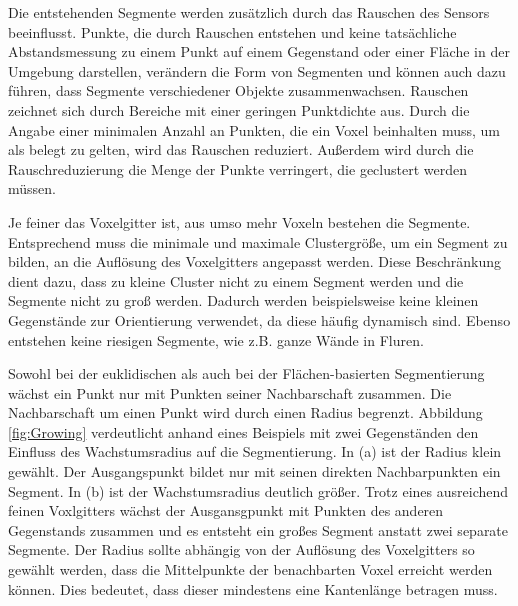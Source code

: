 
Die entstehenden Segmente werden zusätzlich durch das Rauschen des Sensors beeinflusst. Punkte, die durch Rauschen entstehen und keine tatsächliche Abstandsmessung zu einem Punkt auf einem Gegenstand oder einer Fläche in der Umgebung darstellen, verändern die Form von Segmenten und können auch dazu führen, dass Segmente verschiedener Objekte zusammenwachsen. Rauschen zeichnet sich durch Bereiche mit einer geringen Punktdichte aus. Durch die Angabe einer minimalen Anzahl an Punkten, die ein Voxel beinhalten muss, um als belegt zu gelten, wird das Rauschen reduziert. Außerdem wird durch die Rauschreduzierung die Menge der Punkte verringert, die geclustert werden müssen.  

Je feiner das Voxelgitter ist, aus umso mehr Voxeln bestehen die Segmente. Ent\-spre\-chend muss die minimale und maximale Clustergröße, um ein Segment zu bilden, an die Auflösung des Voxelgitters angepasst werden. Diese Beschränkung dient dazu, dass zu kleine Cluster nicht zu einem Segment werden und die Segmente nicht zu groß werden. Dadurch werden beispielsweise keine kleinen Gegenstände zur Orientierung verwendet, da diese häufig dynamisch sind. Ebenso entstehen keine riesigen Segmente, wie z.B. ganze Wände in Fluren. 

Sowohl bei der euklidischen als auch bei der Flächen-basierten Segmentierung wächst ein Punkt nur mit Punkten seiner Nachbarschaft zusammen. Die Nachbarschaft um einen Punkt wird durch einen Radius begrenzt. Abbildung \ref{fig:Growing} verdeutlicht anhand eines Beispiels mit zwei Gegenständen den Einfluss des Wachstumsradius auf die Segmentierung. In (a) ist der Radius klein gewählt. Der Ausgangspunkt bildet nur mit seinen direkten Nachbarpunkten ein Segment. In (b) ist der Wachstumsradius deutlich größer. Trotz eines ausreichend feinen Voxlgitters wächst der Ausgansgpunkt mit Punkten des anderen Gegenstands zusammen und es entsteht ein großes Segment anstatt zwei separate Segmente. Der Radius sollte abhängig von der Auflösung des Voxelgitters so gewählt werden, dass die Mittelpunkte der benachbarten Voxel erreicht werden können. Dies bedeutet, dass dieser mindestens eine Kantenlänge betragen muss.  


